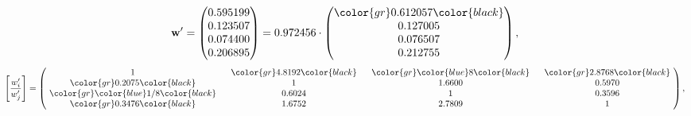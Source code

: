 \begin{example}
\begin{equation*}
\mathbf{w}^{\prime} =
\begin{pmatrix}
0.595199\\
0.123507\\
0.074400\\
0.206895
\end{pmatrix} =
0.972456\cdot
\begin{pmatrix}
\color{gr} 0.612057\color{black} \\
0.127005\\
0.076507\\
0.212755
\end{pmatrix},
\end{equation*}
\begin{equation*}
\left[ \frac{{w}^{\prime}_i}{{w}^{\prime}_j} \right] =
\begin{pmatrix}
$\,\,$ 1 $\,\,$ & $\,\,$\color{gr} 4.8192\color{black} $\,\,$ & $\,\,$\color{gr} \color{blue} 8\color{black} $\,\,$ & $\,\,$\color{gr} 2.8768\color{black} $\,\,$ \\
$\,\,$\color{gr} 0.2075\color{black} $\,\,$ & $\,\,$ 1 $\,\,$ & $\,\,$1.6600$\,\,$ & $\,\,$0.5970  $\,\,$ \\
$\,\,$\color{gr} \color{blue}  1/8\color{black} $\,\,$ & $\,\,$0.6024$\,\,$ & $\,\,$ 1 $\,\,$ & $\,\,$0.3596 $\,\,$ \\
$\,\,$\color{gr} 0.3476\color{black} $\,\,$ & $\,\,$1.6752$\,\,$ & $\,\,$2.7809$\,\,$ & $\,\,$ 1  $\,\,$ \\
\end{pmatrix},
\end{equation*}
\end{example}
\newpage
